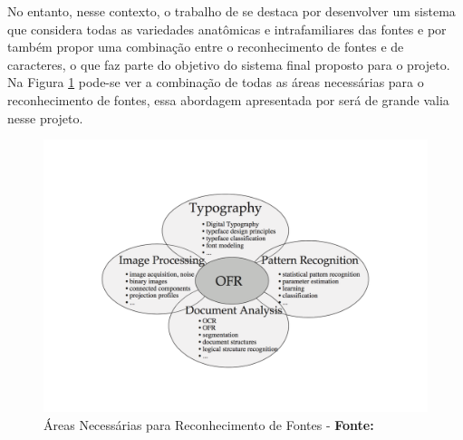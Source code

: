No entanto, nesse contexto, o trabalho de  se destaca por desenvolver um sistema que considera todas as variedades anatômicas e intrafamiliares das fontes e por também propor uma combinação entre o reconhecimento de fontes e de caracteres, o que faz parte do objetivo do sistema final proposto para o projeto. Na Figura \ref{fig:OFRareas} pode-se ver a combinação de todas as áreas necessárias para o reconhecimento de fontes, essa abordagem apresentada por  será de grande valia nesse projeto.

\begin{figure}[H]
  \centering
  \includegraphics[width=0.8\linewidth]{figuras/OFRareas.pdf}
  \caption{Áreas Necessárias para Reconhecimento de Fontes - \textbf{Fonte:} }
  \label{fig:OFRareas}
\end{figure}









